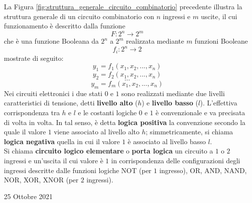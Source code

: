 \documentclass[a4paper]{extarticle}
\begin{document}
\noindent
La Figura \ref{fig:struttura_generale_circuito_combinatorio} precedente illustra la struttura generale di un circuito combinatorio con \(n\) ingressi e \(m\) uscite, il cui funzionamento è descritto dalla funzione
\[F : 2^n \rightarrow 2^m\]
che è una funzione Booleana da \(2^n\) a \(2^m\) realizzata mediante \(m\) funzioni Booleane
\[f_i : 2^n \rightarrow 2\]
mostrate di seguito:
\[y_1 = f_1 (x_1, x_2, ..., x_n)\]
\[y_2 = f_2 (x_1, x_2, ..., x_n)\]
\[...\]
\[y_m = f_m (x_1, x_2, ..., x_n)\]
Nei circuiti elettronici i due stati $0$ e $1$ sono realizzati mediante due livelli caratteristici di tensione, detti \textbf{livello alto} ($h$) e \textbf{livello basso} ($l$). L’effettiva corrispondenza tra $h$ e $l$ e le costanti logiche $0$ e $1$ è convenzionale e va precisata di volta in volta. In tal senso, è detta \textbf{logica positiva} la convenzione secondo la quale il valore $1$ viene associato al livello alto $h$; simmetricamente, si chiama \textbf{logica negativa} quella in cui il valore $1$ è associato al livello basso $l$.\\
Si chiama \textbf{circuito logico elementare} o \textbf{porta logica} un circuito a $1$ o $2$ ingressi e un’uscita il cui valore è $1$ in corrispondenza delle configurazioni degli ingressi descritte dalle funzioni logiche NOT (per $1$ ingresso), OR, AND, NAND, NOR, XOR, XNOR (per $2$ ingressi).

\newpage
\begin{center}
    25 Ottobre 2021
\end{center}
\end{document}
